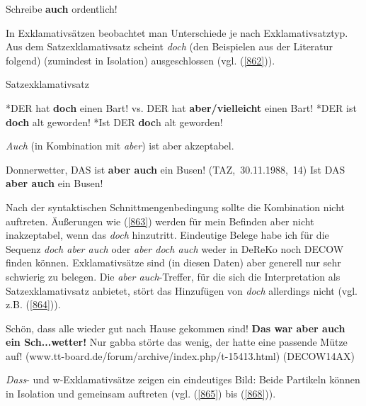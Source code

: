 {\begin{exe}
	\ex\label{861}
	Schreibe \textbf{auch} ordentlich!
	\hfill\hbox {\citet[90]{Helbig1990}}
\end{exe}
In Exklamativsätzen  beobachtet man Unterschiede je nach Exklamativsatztyp. Aus dem Satzexklamativsatz  scheint \textit{doch} (den Beispielen aus der Literatur folgend) (zumindest in Isolation) ausgeschlossen (vgl. (\ref{862})).

\begin{exe}
	\ex\label{862}Satzexklamativsatz\\[-1.25em]
		\begin{xlist}	
			\ex\label{862a} *DER hat \textbf{doch} einen Bart! vs. DER hat \textbf{aber/vielleicht} einen Bart!
			\newline
			\hbox{}\hfill\hbox {\citet[218]{Rinas2006}}
			\ex\label{862b} *DER ist \textbf{doch} alt geworden!
	 		\ex\label{862c} *Ist DER \textbf{doc}h alt geworden!		
	 		\hfill\hbox {\citet[224]{Kwon2005}}	
		\end{xlist}
\end{exe}	
\textit{Auch} (in Kombination mit \textit{aber}) ist aber akzeptabel.

\begin{exe}
	\ex\label{863}
		\begin{xlist}	
			\ex\label{863a} Donnerwetter, DAS ist \textbf{aber auch} ein Busen!	
			\hfill\hbox {(TAZ, 30.11.1988, 14)}
	 		\ex\label{863b} Ist DAS \textbf{aber auch} ein Busen!		
	 		\hfill\hbox {\citet[224]{Kwon2005}}	
		\end{xlist}
\end{exe}	
Nach der syntaktischen Schnittmengenbedingung sollte die Kombination nicht auftreten. Äußerungen wie (\ref{863}) werden für mein Befinden aber nicht inakzep\-tabel, wenn das \textit{doch} hinzutritt. Eindeutige Belege habe ich für die Sequenz \textit{doch aber auch} oder \textit{aber doch auch} weder in DeReKo noch DECOW finden können. Exklamativsätze sind (in diesen Daten) aber generell nur sehr schwierig zu belegen. Die \textit{aber auch}-Treffer, für die sich die Interpretation als Satzexklamativsatz anbietet, stört das Hinzufügen von \textit{doch} allerdings nicht (vgl. z.B. (\ref{864})).

\begin{exe}
	\ex\label{864}
	\scriptsize
	Schön, dass alle wieder gut nach Hause gekommen sind! \textbf{Das war aber auch ein Sch...wetter!} Nur gabba störte das wenig, der hatte eine 				passende Mütze auf!   
	\newline
	\hbox{}\hfill\hbox {(www.tt-board.de/forum/archive/index.php/t-15413.html)}
	\newline
	\hbox{}\hfill\hbox {(DECOW14AX)}
\end{exe}   													  
\textit{Dass}- und w-Exklamativsätze zeigen ein eindeutiges Bild: Beide Partikeln können in Isolation und gemeinsam auftreten (vgl. (\ref{865}) bis (\ref{868})).

}
